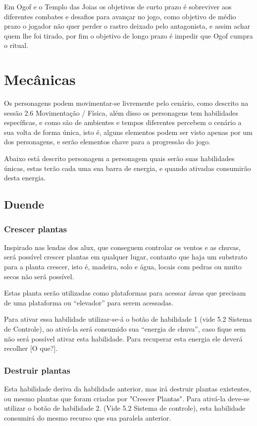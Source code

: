 Em Ogof e o Templo das Joias os objetivos de curto prazo é sobreviver aos diferentes combates e desafios para avançar no jogo, como objetivo de médio prazo o jogador não quer perder o rastro deixado pelo antagonista, e assim achar quem lhe foi tirado, por fim o objetivo de longo prazo é impedir que Ogof cumpra o ritual.

\section{Mecânicas}

Os personagens podem movimentar-se livremente pelo cenário, como descrito na sessão 2.6 Movimentação / Física, além disso os personagens tem habilidades específicas, e como são de ambientes e tempos diferentes percebem o cenário a sua volta de forma única, isto é, alguns elementos podem ser visto apenas por um dos personagens, e serão elementos chave para a progressão do jogo.

Abaixo está descrito personagem a personagem quais serão suas habilidades únicas, estas terão cada uma sua barra de energia, e quando ativadas consumirão desta energia.

\subsection{Duende}
\subsubsection{Crescer plantas}
Inspirado nas lendas dos alux, que conseguem controlar os ventos e as chuvas, será possível crescer plantas em qualquer lugar, contanto que haja um substrato para a planta crescer, isto é,  madeira, solo e água, locais com pedras ou muito secos não será possível.

Estas planta serão utilizadas como plataformas para acessar áreas que precisam de uma plataforma ou ``elevador'' para serem acessadas.

Para ativar essa habilidade utilizar-se-á o botão de habilidade 1 (vide 5.2 Sistema de Controle), ao ativá-la será consumido sua ``energia de chuva'', caso fique sem não será possível ativar esta habilidade. Para recuperar esta energia ele deverá recolher [O que?].


\subsubsection{Destruir plantas}
Esta habilidade deriva da habilidade anterior, mas irá destruir plantas existentes, ou mesmo plantas que foram criadas por "Crescer Plantas". Para ativá-la deve-se utilizar o botão de habilidade 2. (Vide 5.2 Sistema de controle), esta  habilidade consumirá do mesmo recurso que sua paralela anterior. 


